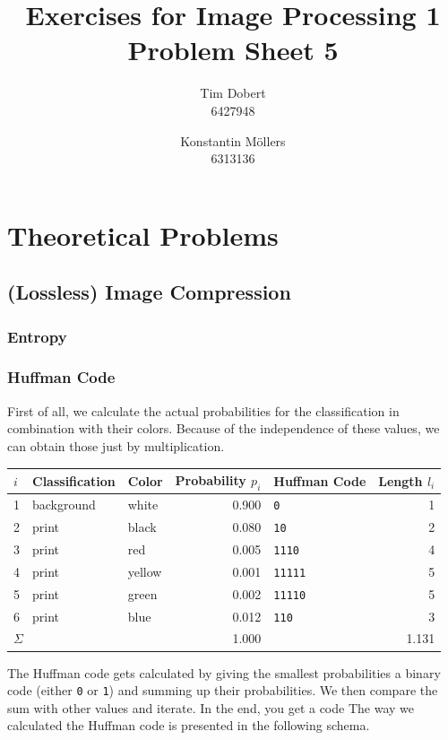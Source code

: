 \documentclass[a4paper,12pt]{article}
\title{\textbf{Exercises for Image Processing 1}\\Problem Sheet 5}
\author{Tim Dobert\\6427948 \and Konstantin M\"ollers\\6313136}
\begin{document}
	\maketitle	
	
	\section{Theoretical Problems}
	\subsection{(Lossless) Image Compression}
	
	\subsubsection{Entropy}
	\subsubsection{Huffman Code}
	
	First of all, we calculate the actual probabilities for the classification in combination with their colors. Because of the independence of these values, we can obtain those just by multiplication.
	
	\begin{table}[h!]
		\centering
		\begin{tabular}{l|l|l|r|l|r}
			$i$ & \textbf{Classification} & \textbf{Color} & \textbf{Probability} $p_i$ & \textbf{Huffman Code} & \textbf{Length} $l_i$ \\\hline
			1 & background & white & 0.900 & \texttt{0} & 1 \\
			2 & print & black & 0.080 & \texttt{10} & 2 \\
			3 & print & red & 0.005 & \texttt{1110} & 4\\
			4 & print & yellow & 0.001 & \texttt{11111} & 5\\
			5 & print & green & 0.002 & \texttt{11110} & 5\\
			6 & print & blue & 0.012 & \texttt{110} & 3\\\hline
			\multicolumn{3}{l|}{$\Sigma$} & 1.000 & \multicolumn{2}{r}{1.131}
		\end{tabular}
	\end{table}
	
	The Huffman code gets calculated by giving the smallest probabilities a binary code (either \texttt{0} or \texttt{1}) and summing up their probabilities. We then compare the sum with other values and iterate. In the end, you get a code The way we calculated the Huffman code is presented in the following schema.
	
\end{document}
